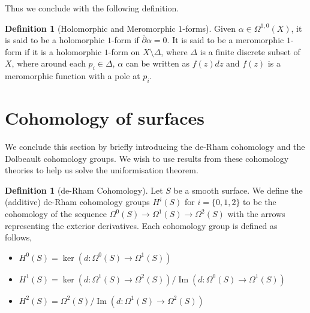 \documentclass[11pt]{report}
\theoremstyle{definition}
\newtheorem{defn}[thm]{Definition}
\DeclareMathOperator{\im}{Im}
\begin{document}
Thus we conclude with the following definition.
\begin{defn}[Holomorphic and Meromorphic $1$-forms]
  Given $\alpha \in \Omega^{1,0}(X)$, it is said to be a holomorphic $1$-form if $\overline{\partial} \alpha = 0$. It is said to be a meromorphic $1$-form if it is a holomorphic $1$-form on $X\setminus \Delta$, where $\Delta$ is a finite discrete subset of $X$, where around each $p_i \in \Delta$, $\alpha$ can be written as $f(z)dz$ and $f(z)$ is a meromorphic function with a pole at $p_i$.
\end{defn}

\section{Cohomology of surfaces}
We conclude this section by briefly introducing the de-Rham cohomology and the Dolbeault cohomology groups. We wish to use results from these cohomology theories to help us solve the uniformisation theorem.
\begin{defn}[de-Rham Cohomology]\label{deRham}
  Let $S$ be a smooth surface. We define the (additive) de-Rham cohomology groups $H^i(S)$ for $i=\{0,1,2\}$ to be the cohomology of the sequence $\Omega^0(S)\rightarrow \Omega^1(S)\rightarrow \Omega^2(S)$ with the arrows representing the exterior derivatives. Each cohomology group is defined as follows,
  \begin{itemize}
    \item $H^0(S)=\ker(d:\Omega^0(S)\rightarrow\Omega^1(S))$
    \item $H^1(S)=\ker(d:\Omega^1(S)\rightarrow\Omega^2(S))/\im(d:\Omega^0(S)\rightarrow \Omega^1(S))$
    \item $H^2(S)=\Omega^2(S)/\im(d:\Omega^1(S)\rightarrow \Omega^2(S))$
  \end{itemize}
\end{defn}
\end{document}
